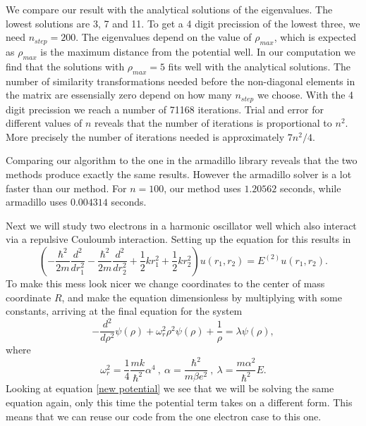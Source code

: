 \documentclass{aa}   %
\begin{document}
We compare our result with the analytical solutions of the eigenvalues. The lowest solutions are 3, 7 and 11. To get a 4 digit precission of the lowest three, we need $n_{step} = 200$. The eigenvalues depend on the value of $\rho_{max}$, which is expected as $\rho_{max}$ is the maximum distance from the potential well. In our computation we find that the solutions with $\rho_{max} = 5$ fits well with the analytical solutions. The number of similarity transformations needed before the non-diagonal elements in the matrix are essensially zero depend on how many $n_{step}$ we choose. With the 4 digit precission we reach a number of 71168 iterations. Trial and error for different values of $n$ reveals that the number of iterations is proportional to $n^2$. More precisely the number of iterations needed is approximately $7n^2/4$.

Comparing our algorithm to the one in the armadillo library reveals that the two methods produce exactly the same results. However the armadillo solver is a lot faster than our method. For $n = 100$, our method uses $1.20562$ seconds, while armadillo uses $0.004314$ seconds.

Next we will study two electrons in a harmonic oscillator well which also interact via a repulsive Couloumb interaction. Setting up the equation for this results in
\begin{equation}
 \left(  -\frac{\hbar^2}{2 m} \frac{d^2}{dr_1^2} -\frac{\hbar^2}{2 m} \frac{d^2}{dr_2^2}+ \frac{1}{2}k r_1^2+ \frac{1}{2}k r_2^2\right)u(r_1,r_2)  = E^{(2)} u(r_1,r_2).
\end{equation}
To make this mess look nicer we change coordinates to the center of mass coordinate $R$, and make the equation dimensionless by multiplying with some constants, arriving at the final equation for the system
\begin{equation}
   -\frac{d^2}{d\rho^2} \psi(\rho) + \omega_r^2\rho^2\psi(\rho) +\frac{1}{\rho} = \lambda \psi(\rho),
\end{equation}\label{new potential}
where 
\begin{equation*}
 \omega_r^2=\frac{1}{4}\frac{mk}{\hbar^2} \alpha^4~,~\alpha = \frac{\hbar^2}{m\beta e^2}~,~\lambda = \frac{m\alpha^2}{\hbar^2}E.
\end{equation*}
Looking at equation \ref{new potential} we see that we will be solving the same equation again, only this time the potential term takes on a different form. This means that we can reuse our code from the one electron case to this one.
\end{document}
